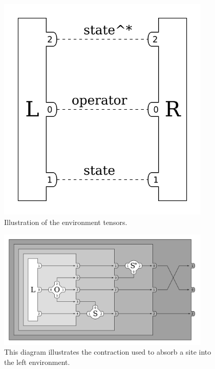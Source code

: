 \documentclass{article}
\newcommand{\diagramwidth}{4in}
\begin{document}
\begin{appendices}
\begin{figure}\begin{center}
\includegraphics[width=\diagramwidth]{drawings/expectation_boundary_tensors-car}
\caption{\label{fig:environment-tensors-opt} Illustration of the environment tensors.}
\end{center}\end{figure}

\begin{figure}\begin{center}
\includegraphics[width=\diagramwidth]{drawings/contract_sos_left-opt}
\caption{\label{fig:contract_sos_left-opt} This diagram illustrates the contraction used to absorb a site into the left environment.}
\end{center}\end{figure}


\end{appendices}
\end{document}
